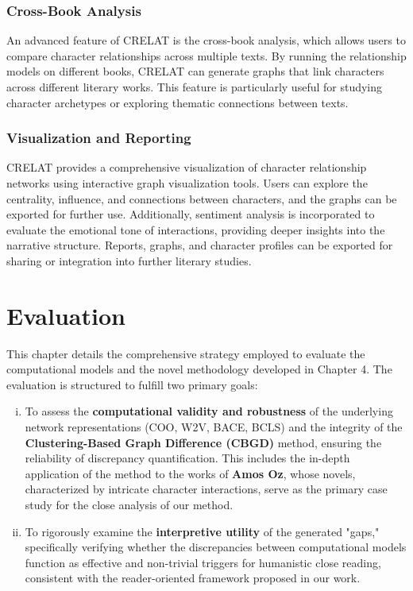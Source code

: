 \documentclass[a4paper,12pt]{report}
\begin{document}
\subsection{Cross-Book Analysis}
An advanced feature of CRELAT is the cross-book analysis, which allows users to compare character relationships across multiple texts. By running the relationship models on different books, CRELAT can generate graphs that link characters across different literary works. This feature is particularly useful for studying character archetypes or exploring thematic connections between texts.

\subsection{Visualization and Reporting}
CRELAT provides a comprehensive visualization of character relationship networks using interactive graph visualization tools. Users can explore the centrality, influence, and connections between characters, and the graphs can be exported for further use. Additionally, sentiment analysis is incorporated to evaluate the emotional tone of interactions, providing deeper insights into the narrative structure. Reports, graphs, and character profiles can be exported for sharing or integration into further literary studies.
\chapter{Evaluation}
\label{chap:evaluation}

This chapter details the comprehensive strategy employed to evaluate the computational models and the novel methodology developed in Chapter 4. The evaluation is structured to fulfill two primary goals:
\begin{enumerate}[(i)]
    \item To assess the \textbf{computational validity and robustness} of the underlying network representations (COO, W2V, BACE, BCLS) and the integrity of the \textbf{Clustering-Based Graph Difference (CBGD)} method, ensuring the reliability of discrepancy quantification. This includes the in-depth application of the method to the works of \textbf{Amos Oz}, whose novels, characterized by intricate character interactions, serve as the primary case study for the close analysis of our method.
    \item To rigorously examine the \textbf{interpretive utility} of the generated "gaps," specifically verifying whether the discrepancies between computational models function as effective and non-trivial triggers for humanistic close reading, consistent with the reader-oriented framework proposed in our work.
\end{enumerate}
\end{document}
